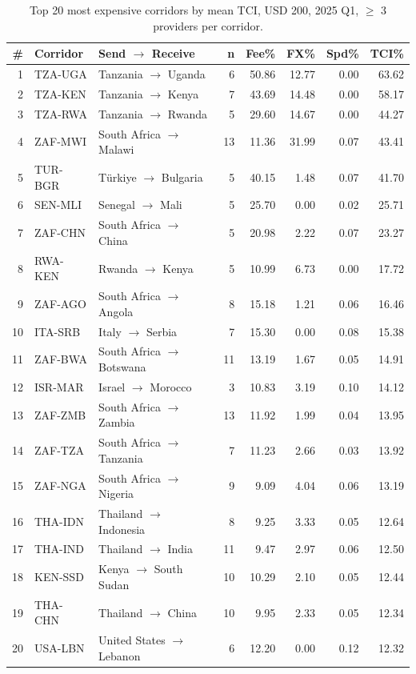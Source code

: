 \documentclass[
  11pt,
]{article}
\begin{document}
\begin{table}[h]
\centering
\caption{Top 20 most expensive corridors by mean TCI, USD 200, 2025 Q1, $\geq$ 3 providers per corridor.}
\small
\begin{tabular}{rllrrrrr}
\toprule
\textbf{\#} & \textbf{Corridor} & \textbf{Send $\to$ Receive} & \textbf{n} & \textbf{Fee\%} & \textbf{FX\%} & \textbf{Spd\%} & \textbf{TCI\%} \\
\midrule
1 & TZA-UGA & Tanzania $\to$ Uganda          &  6 & 50.86 & 12.77 & 0.00 & 63.62 \\
2 & TZA-KEN & Tanzania $\to$ Kenya           &  7 & 43.69 & 14.48 & 0.00 & 58.17 \\
3 & TZA-RWA & Tanzania $\to$ Rwanda          &  5 & 29.60 & 14.67 & 0.00 & 44.27 \\
4 & ZAF-MWI & South Africa $\to$ Malawi      & 13 & 11.36 & 31.99 & 0.07 & 43.41 \\
5 & TUR-BGR & Türkiye $\to$ Bulgaria         &  5 & 40.15 &  1.48 & 0.07 & 41.70 \\
6 & SEN-MLI & Senegal $\to$ Mali             &  5 & 25.70 &  0.00 & 0.02 & 25.71 \\
7 & ZAF-CHN & South Africa $\to$ China       &  5 & 20.98 &  2.22 & 0.07 & 23.27 \\
8 & RWA-KEN & Rwanda $\to$ Kenya             &  5 & 10.99 &  6.73 & 0.00 & 17.72 \\
9 & ZAF-AGO & South Africa $\to$ Angola      &  8 & 15.18 &  1.21 & 0.06 & 16.46 \\
10 & ITA-SRB & Italy $\to$ Serbia            &  7 & 15.30 &  0.00 & 0.08 & 15.38 \\
11 & ZAF-BWA & South Africa $\to$ Botswana   & 11 & 13.19 &  1.67 & 0.05 & 14.91 \\
12 & ISR-MAR & Israel $\to$ Morocco          &  3 & 10.83 &  3.19 & 0.10 & 14.12 \\
13 & ZAF-ZMB & South Africa $\to$ Zambia     & 13 & 11.92 &  1.99 & 0.04 & 13.95 \\
14 & ZAF-TZA & South Africa $\to$ Tanzania   &  7 & 11.23 &  2.66 & 0.03 & 13.92 \\
15 & ZAF-NGA & South Africa $\to$ Nigeria    &  9 &  9.09 &  4.04 & 0.06 & 13.19 \\
16 & THA-IDN & Thailand $\to$ Indonesia      &  8 &  9.25 &  3.33 & 0.05 & 12.64 \\
17 & THA-IND & Thailand $\to$ India          & 11 &  9.47 &  2.97 & 0.06 & 12.50 \\
18 & KEN-SSD & Kenya $\to$ South Sudan       & 10 & 10.29 &  2.10 & 0.05 & 12.44 \\
19 & THA-CHN & Thailand $\to$ China          & 10 &  9.95 &  2.33 & 0.05 & 12.34 \\
20 & USA-LBN & United States $\to$ Lebanon   &  6 & 12.20 &  0.00 & 0.12 & 12.32 \\
\bottomrule
\end{tabular}
\end{table}
\end{document}
